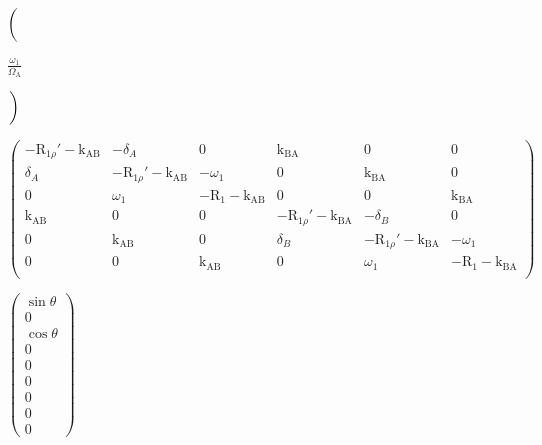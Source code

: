 \documentclass[a4paper,11pt,twoside,openright]{book}
\def\lthtmlcheckvsize{\ifdim\ht\sizebox<\vsize 
  \ifdim\wd\sizebox<\hsize\expandafter\hfill\fi \expandafter\vfill
  \else\expandafter\vss\fi}%
\begin{document}
{\newpage\clearpage
{}%
$\displaystyle \left(\vphantom{ \frac{\omega_1 }{\Omega_{\textrm{A}}} }\right.$%
\lthtmlindisplaymathZ
\lthtmlcheckvsize\clearpage}

{\newpage\clearpage
{}%
$\displaystyle {\frac{{\omega_1 }}{{\Omega_{\textrm{A}}}}}$%
\lthtmlindisplaymathZ
\lthtmlcheckvsize\clearpage}

{\newpage\clearpage
{}%
$\displaystyle \left.\vphantom{ \frac{\omega_1 }{\Omega_{\textrm{A}}} }\right)$%
\lthtmlindisplaymathZ
\lthtmlcheckvsize\clearpage}

{\newpage\clearpage
{}%
$\displaystyle \begin{pmatrix}
-\mathrm{R}_{1\rho}'-\textrm{k}_{\textrm{AB}}& -\delta_A           & 0           & \textrm{k}_{\textrm{BA}}& 0                   & 0 \\
\delta_A            & -\mathrm{R}_{1\rho}'-\textrm{k}_{\textrm{AB}}& -\omega_1 & 0                   & \textrm{k}_{\textrm{BA}}& 0 \\
0                   & \omega_1 & -\mathrm{R}_1-\textrm{k}_{\textrm{AB}}& 0                   & 0                   & \textrm{k}_{\textrm{BA}}\\
\textrm{k}_{\textrm{AB}}& 0                   & 0           & -\mathrm{R}_{1\rho}'-\textrm{k}_{\textrm{BA}}& -\delta_B           & 0 \\
0                   & \textrm{k}_{\textrm{AB}}& 0           & \delta_B            & -\mathrm{R}_{1\rho}'-\textrm{k}_{\textrm{BA}}& -\omega_1 \\
0                   & 0                   & \textrm{k}_{\textrm{AB}}& 0                   & \omega_1 & -\mathrm{R}_1-\textrm{k}_{\textrm{BA}}\\
\end{pmatrix}$%
\lthtmlindisplaymathZ
\lthtmlcheckvsize\clearpage}

{\newpage\clearpage
{}%
$\displaystyle \begin{pmatrix} \sin{\theta} \\0 \\\cos{\theta} \\0 \\0 \\0 \\0 \\0 \\0  \end{pmatrix}$%
\lthtmlindisplaymathZ
\lthtmlcheckvsize\clearpage}
\end{document}
